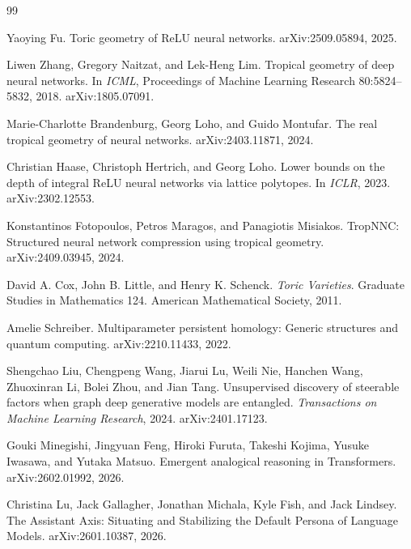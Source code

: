 \documentclass[11pt]{article}
\theoremstyle{definition}
\theoremstyle{plain}
\theoremstyle{remark}
\numberwithin{equation}{section}
\begin{document}
\begin{thebibliography}{99}

Yaoying Fu.
\newblock Toric geometry of ReLU neural networks.
\newblock arXiv:2509.05894, 2025.

Liwen Zhang, Gregory Naitzat, and Lek-Heng Lim.
\newblock Tropical geometry of deep neural networks.
\newblock In \emph{ICML}, Proceedings of Machine Learning Research 80:5824--5832, 2018. arXiv:1805.07091.

Marie-Charlotte Brandenburg, Georg Loho, and Guido Montufar.
\newblock The real tropical geometry of neural networks.
\newblock arXiv:2403.11871, 2024.

Christian Haase, Christoph Hertrich, and Georg Loho.
\newblock Lower bounds on the depth of integral ReLU neural networks via lattice polytopes.
\newblock In \emph{ICLR}, 2023. arXiv:2302.12553.

Konstantinos Fotopoulos, Petros Maragos, and Panagiotis Misiakos.
\newblock TropNNC: Structured neural network compression using tropical geometry.
\newblock arXiv:2409.03945, 2024.

David A. Cox, John B. Little, and Henry K. Schenck.
\newblock \emph{Toric Varieties}.
\newblock Graduate Studies in Mathematics 124. American Mathematical Society, 2011.

Amelie Schreiber.
\newblock Multiparameter persistent homology: Generic structures and quantum computing.
\newblock arXiv:2210.11433, 2022.

Shengchao Liu, Chengpeng Wang, Jiarui Lu, Weili Nie, Hanchen Wang, Zhuoxinran Li, Bolei Zhou, and Jian Tang.
\newblock Unsupervised discovery of steerable factors when graph deep generative models are entangled.
\newblock \emph{Transactions on Machine Learning Research}, 2024. arXiv:2401.17123.

Gouki Minegishi, Jingyuan Feng, Hiroki Furuta, Takeshi Kojima, Yusuke Iwasawa, and Yutaka Matsuo.
\newblock Emergent analogical reasoning in Transformers.
\newblock arXiv:2602.01992, 2026.

Christina Lu, Jack Gallagher, Jonathan Michala, Kyle Fish, and Jack Lindsey.
\newblock The Assistant Axis: Situating and Stabilizing the Default Persona of Language Models.
\newblock arXiv:2601.10387, 2026.


\end{thebibliography}
\end{document}
